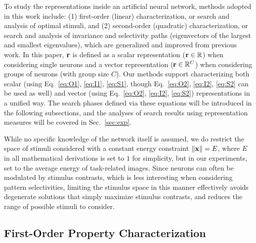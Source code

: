 \documentclass[10pt,twocolumn,letterpaper]{article}
\begin{document}
To study the representations inside an artificial neural network, methods adopted in this work include: (1) first-order (\ie linear) characterization, or search and analysis of optimal stimuli, and (2) second-order (\ie quadratic) characterization, or search and analysis of invariance and selectivity paths (\ie eigenvectors of the largest and smallest eigenvalues), which are generalized and improved from previous work.
In this paper, $\bf{r}$ is defined as a scalar representation (\ie $\bf{r} \in \mathbb{R}$) when considering single neurons and a vector representation (\ie ${\bf{r}} \in \mathbb{R}^C$) when considering groups of neurons (with group size $C$).
Our methods support characterizing both scalar (using Eq.~\ref{eq:O1}, \ref{eq:I1}, \ref{eq:S1}, though Eq.~\ref{eq:O2}, \ref{eq:I2}, \ref{eq:S2} can be used as well) and vector (using Eq.~\ref{eq:O2}, \ref{eq:I2}, \ref{eq:S2}) representations in a unified way.
The search phases defined via these equations will be introduced in the following subsections, and the analyses of search results using representation measures will be covered in Sec.~\ref{sec:exp}.


While no specific knowledge of the network itself is assumed, we do restrict the space of stimuli considered with a constant energy constraint $\left\| \bf{x} \right\| = E$, where $E$ in all mathematical derivations is set to $1$ for simplicity, but in our experiments, set to the average energy of task-related images.
Since neurons can often be modulated by stimulus contrasts, which is less interesting when considering pattern selectivities, limiting the stimulus space in this manner effectively avoids degenerate solutions that simply maximize stimulus contrasts, and reduces the range of possible stimuli to consider.


\subsection{First-Order Property Characterization}
\end{document}
